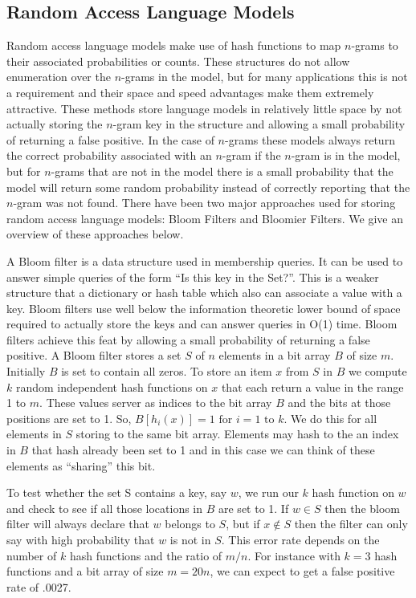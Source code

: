 \documentclass[10pt, a4paper]{article}
\begin{document}
\subsection{Random Access Language Models}
Random access language models \cite{Talbot07smoothedbloom,talbot1,talbot-osborne:2007:ACLMain} make use of hash functions to map $n$-grams to their associated probabilities or counts.  These structures do not allow enumeration over the $n$-grams in the model, but for many applications this is not a requirement and their space and speed advantages make them extremely attractive.  These methods store language models in relatively little space by not actually storing the $n$-gram key in the structure and allowing a small probability of returning a false positive.  In the case of $n$-grams these models always return the correct probability associated with an $n$-gram if the $n$-gram is in the model, but for $n$-grams that are not in the model there is a small probability that the model will return some random probability instead of correctly reporting that the $n$-gram was not found.  There have been two major approaches used for storing random access language models: Bloom Filters and Bloomier Filters.  We give an overview of these approaches below.

A Bloom filter \cite{bloom} is a data structure used in membership queries.  It can be used to answer simple queries of the form ``Is this key in the Set?''.  This is a weaker structure that a dictionary or  hash table which also can associate a value with a key.  Bloom filters use well below the information theoretic lower bound of space required to actually store the keys and can answer queries in O(1) time.  Bloom filters achieve this feat by allowing a small probability of returning a false positive.  A Bloom filter stores a set $S$ of $n$ elements in a bit array $B$ of size $m$.  Initially $B$ is set to contain all zeros.  To store an item $x$ from $S$ in $B$ we compute $k$ random independent hash functions on $x$ that each return a value in the range 1 to $m$.  These values server as indices to the bit array $B$ and  the bits at those positions are set to 1.  So, $B[h_i(x)]=1 \mbox{ for } i=1 \mbox{ to } k$.  We do this for all elements in $S$ storing to the same bit array.  Elements may hash to the an index in $B$ that hash already been set to 1 and in this case we can think of these elements as ``sharing'' this bit.

To test whether the set S contains a key, say $w$, we run our $k$ hash function on $w$ and check to see if all those locations in $B$ are set to 1.  If $w \in S$ then the bloom filter will always declare that $w$ belongs to $S$, but if $x \notin S$ then the filter can only say with high probability that $w$ is not in $S$.  This error rate depends on the number of $k$ hash functions and the ratio of $m/n$.  For instance with $k=3$ hash functions and a bit array of size $m=20n$, we can expect to get a false positive rate of .0027.
\end{document}

